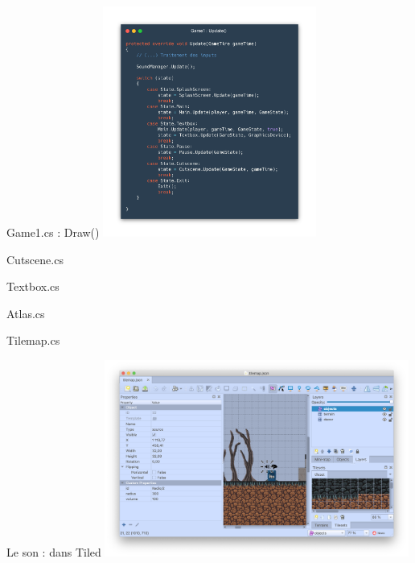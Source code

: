 \documentclass{beamer}
\begin{document}
\begin{frame}{Game1.cs : Draw()}
    \centering
    \includegraphics[width=7cm]{assets/game1update}
\end{frame}

\begin{frame}{Cutscene.cs}
  
\end{frame}

\begin{frame}{Textbox.cs}
  
\end{frame}

\begin{frame}{Atlas.cs}
  
\end{frame}

\begin{frame}{Tilemap.cs}
  
\end{frame}

\begin{frame}{Le son : dans Tiled}
    \centering
    \includegraphics[width=10cm]{assets/tiledSon}
\end{frame}
\end{document}
